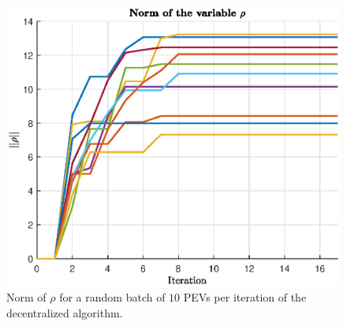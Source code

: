 \begin{figure}[H]
    \centering
    \includegraphics[width=\columnwidth]{figures/images/rho.eps}
    \caption{Norm of $\rho$ for a random batch of $10$ PEVs per iteration of the decentralized algorithm.}
    \label{fig:dec_rho}
\end{figure}
